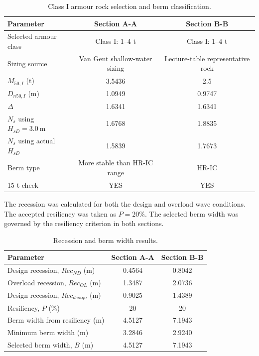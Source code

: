 \documentclass[a4paper, 11pt]{article}
\begin{document}
\begin{table}[H]
\centering
\caption{Class I armour rock selection and berm classification.}
\label{tab:berm_classI}
\begin{tabular}{l c c}
\hline
Parameter & Section A-A & Section B-B \\
\hline
Selected armour class & Class I: 1--4 t & Class I: 1--4 t \\
Sizing source & Van Gent shallow-water sizing & Lecture-table representative rock \\
\(M_{50,I}\) (t) & 3.5436 & 2.5 \\
\(D_{n50,I}\) (m) & 1.0949 & 0.9747 \\
\(\Delta\) & 1.6341 & 1.6341 \\
\(N_s\) using \(H_{sD}=3.0~\mathrm{m}\) & 1.6768 & 1.8835 \\
\(N_s\) using actual \(H_{sD}\) & 1.5839 & 1.7673 \\
Berm type & More stable than HR-IC range & HR-IC \\
15 t check & YES & YES \\
\hline
\end{tabular}
\end{table}

The recession was calculated for both the design and overload wave conditions. The accepted resiliency was taken as \(P=20\%\). The selected berm width was governed by the resiliency criterion in both sections.

\begin{table}[H]
\centering
\caption{Recession and berm width results.}
\label{tab:berm_recession_width}
\begin{tabular}{l c c}
\hline
Parameter & Section A-A & Section B-B \\
\hline
Design recession, \(Rec_{ND}\) (m) & 0.4564 & 0.8042 \\
Overload recession, \(Rec_{OL}\) (m) & 1.3487 & 2.0736 \\
Design recession, \(Rec_{design}\) (m) & 0.9025 & 1.4389 \\
Resiliency, \(P\) (\%) & 20 & 20 \\
Berm width from resiliency (m) & 4.5127 & 7.1943 \\
Minimum berm width (m) & 3.2846 & 2.9240 \\
Selected berm width, \(B\) (m) & 4.5127 & 7.1943 \\
\hline
\end{tabular}
\end{table}
\end{document}
